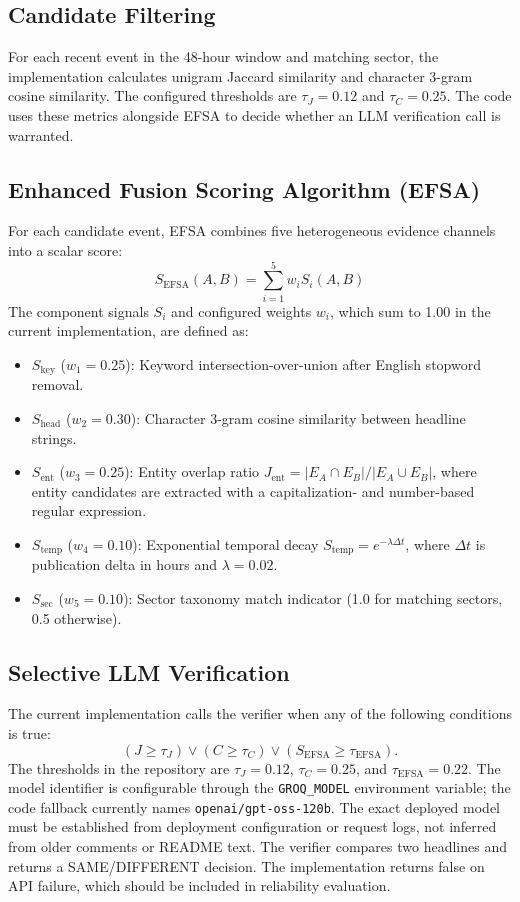 \documentclass[sigconf,natbib=true,anonymous=true]{acmart}
\begin{document}
\subsection{Candidate Filtering}
For each recent event in the 48-hour window and matching sector, the implementation calculates unigram Jaccard similarity and character 3-gram cosine similarity. The configured thresholds are $\tau_J=0.12$ and $\tau_C=0.25$. The code uses these metrics alongside EFSA to decide whether an LLM verification call is warranted.

\subsection{Enhanced Fusion Scoring Algorithm (EFSA)}
For each candidate event, EFSA combines five heterogeneous evidence channels into a scalar score:
\begin{equation}
S_{\text{EFSA}}(A, B) = \sum_{i=1}^{5} w_i S_i(A, B)
\label{eq:efsa}
\end{equation}
The component signals $S_i$ and configured weights $w_i$, which sum to 1.00 in the current implementation, are defined as:
\begin{itemize}
    \item $S_{\text{key}}$ ($w_1 = 0.25$): Keyword intersection-over-union after English stopword removal.
    \item $S_{\text{head}}$ ($w_2 = 0.30$): Character 3-gram cosine similarity between headline strings.
    \item $S_{\text{ent}}$ ($w_3 = 0.25$): Entity overlap ratio $J_{\text{ent}} = |E_A \cap E_B| / |E_A \cup E_B|$, where entity candidates are extracted with a capitalization- and number-based regular expression.
    \item $S_{\text{temp}}$ ($w_4 = 0.10$): Exponential temporal decay $S_{\text{temp}} = e^{-\lambda \Delta t}$, where $\Delta t$ is publication delta in hours and $\lambda = 0.02$.
    \item $S_{\text{sec}}$ ($w_5 = 0.10$): Sector taxonomy match indicator (1.0 for matching sectors, 0.5 otherwise).
\end{itemize}

\subsection{Selective LLM Verification}
The current implementation calls the verifier when any of the following conditions is true:
\begin{equation}
(J \geq \tau_J) \lor (C \geq \tau_C) \lor (S_{\text{EFSA}} \geq \tau_{\text{EFSA}}).
\label{eq:decision}
\end{equation}
The thresholds in the repository are $\tau_J=0.12$, $\tau_C=0.25$, and $\tau_{\text{EFSA}}=0.22$. The model identifier is configurable through the \texttt{GROQ\_MODEL} environment variable; the code fallback currently names \texttt{openai/gpt-oss-120b}. The exact deployed model must be established from deployment configuration or request logs, not inferred from older comments or README text. The verifier compares two headlines and returns a SAME/DIFFERENT decision. The implementation returns false on API failure, which should be included in reliability evaluation.
\end{document}
